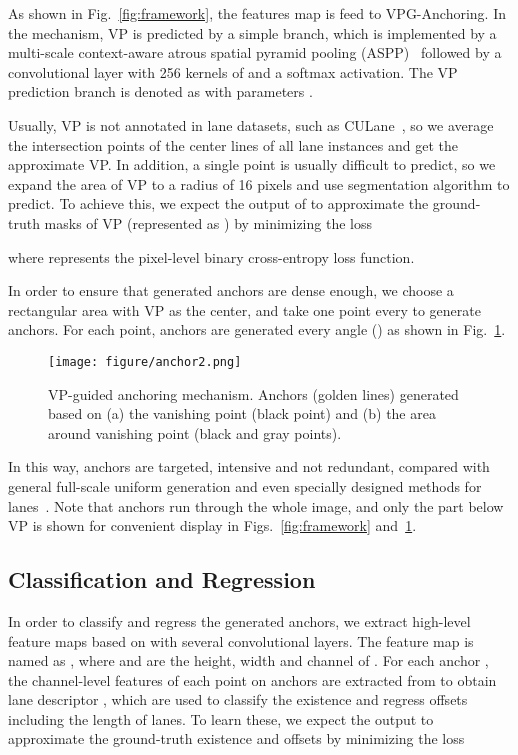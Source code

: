 \documentclass{article}
\begin{document}
As shown in Fig.~\ref{fig:framework}, the features map  is feed to VPG-Anchoring. In the mechanism, VP is predicted by a simple branch, which is implemented by a multi-scale context-aware atrous spatial pyramid pooling (ASPP)~\cite{chen2018encoder} followed by a convolutional layer with 256 kernels of  and a softmax activation. The VP prediction branch is denoted as  with parameters .

Usually, VP is not annotated in lane datasets, such as CULane~\cite{pan2018spatial}, so we average the intersection points of the center lines of all lane instances and get the approximate VP. In addition, a single point is usually difficult to predict, so we expand the area of VP to a radius of 16 pixels and use segmentation algorithm to predict. To achieve this, we expect the output of  to approximate the ground-truth masks of VP (represented as ) by minimizing the loss

where  represents the pixel-level binary cross-entropy loss function.

In order to ensure that generated anchors are dense enough, we choose a  rectangular area with VP as the center, and take one point every  to generate anchors. For each point, anchors are generated every  angle () as shown in Fig.~\ref{fig:anchor}. \begin{figure}[t]
\centering
\texttt{[image: figure/anchor2.png]}
\caption{VP-guided anchoring mechanism. Anchors (golden lines) generated based on (a) the vanishing point (black point) and (b) the area around vanishing point (black and gray points). }
\label{fig:anchor}
\end{figure}
In this way, anchors are targeted, intensive and not redundant, compared with general full-scale uniform generation and even specially designed methods for lanes~\cite{li2019line}. 
Note that anchors run through the whole image, and only the part below VP is shown for convenient display in Figs.~\ref{fig:framework} and~\ref{fig:anchor}.


\subsection{Classification and Regression}
In order to classify and regress the generated anchors, we extract high-level feature maps based on   with several convolutional layers. The feature map is named as , where  and  are the height, width and channel of . For each anchor , the channel-level features of each point on anchors are extracted from  to obtain lane descriptor , which are used to classify the existence  and regress  offsets  including the length  of lanes. To learn these, we expect the output to approximate the ground-truth existence  and  offsets   by minimizing the loss
\end{document}
